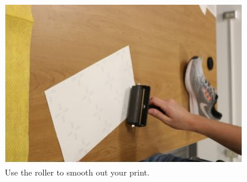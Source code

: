 \begin{figure}[!htp]
\centering
\includegraphics[scale=0.75]{Roller}
\caption{Use the roller to smooth out your print.}
\label{img:Brush2}
\end{figure}



